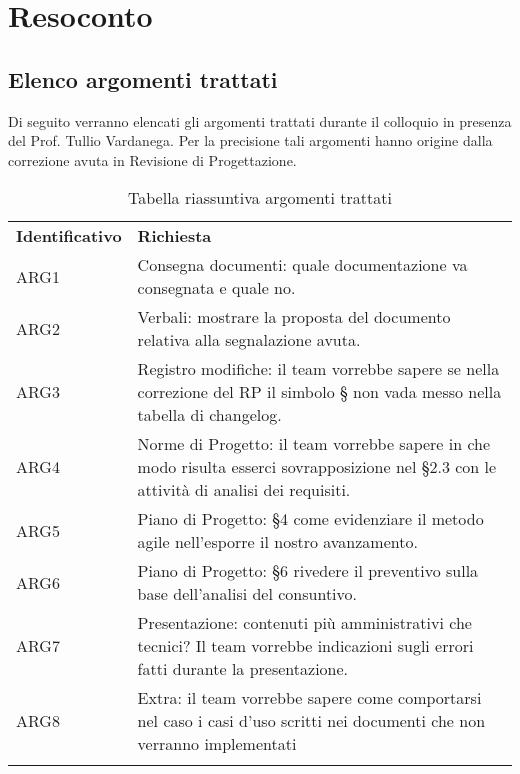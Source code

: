 \clearpage
\section{Resoconto}
	\subsection{Elenco argomenti trattati}
	\label{sec:elenco}
	Di seguito verranno elencati gli argomenti trattati durante il colloquio in presenza del Prof. Tullio Vardanega. Per la precisione tali argomenti hanno origine dalla correzione avuta in Revisione di Progettazione.
		\begin{center}
			\renewcommand{\arraystretch}{1.5}
			\begin{longtable}{  p{2.5cm} p{11.7cm} }
				\rowcolor{tableHeadYellow}
				\textbf{Identificativo}&\textbf{Richiesta}\\
				ARG1 & Consegna documenti: quale documentazione va consegnata e quale no.\\
				ARG2 & Verbali: mostrare la proposta del documento relativa alla segnalazione avuta.\\
				ARG3 & Registro modifiche: il team vorrebbe sapere se nella correzione del RP il simbolo § non vada messo nella tabella di changelog.\\
				ARG4 & Norme di Progetto: il team vorrebbe sapere in che modo risulta esserci sovrapposizione nel §2.3 con le attività di analisi dei requisiti.\\
				ARG5 & Piano di Progetto: §4 come evidenziare il metodo agile nell'esporre il nostro avanzamento.\\
				ARG6 & Piano di Progetto: §6 rivedere il preventivo sulla base dell'analisi del consuntivo.\\
				ARG7 & Presentazione: contenuti più amministrativi che tecnici? Il team vorrebbe indicazioni sugli errori fatti durante la presentazione.\\
				ARG8 & Extra: il team vorrebbe sapere come comportarsi nel caso i casi d’uso scritti nei documenti che non verranno implementati\\
				\rowcolor{white}
				\caption{Tabella riassuntiva argomenti trattati}
			\end{longtable}	
		\end{center}
